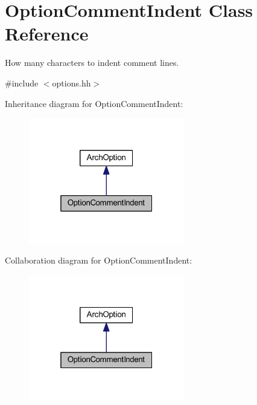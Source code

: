 \hypertarget{class_option_comment_indent}{}\section{Option\+Comment\+Indent Class Reference}
\label{class_option_comment_indent}


How many characters to indent comment lines.  




{\ttfamily \#include $<$options.\+hh$>$}



Inheritance diagram for Option\+Comment\+Indent\+:
\nopagebreak
\begin{figure}[H]
\begin{center}
\leavevmode
\includegraphics[width=193pt]{class_option_comment_indent__inherit__graph}
\end{center}
\end{figure}


Collaboration diagram for Option\+Comment\+Indent\+:
\nopagebreak
\begin{figure}[H]
\begin{center}
\leavevmode
\includegraphics[width=193pt]{class_option_comment_indent__coll__graph}
\end{center}
\end{figure}
